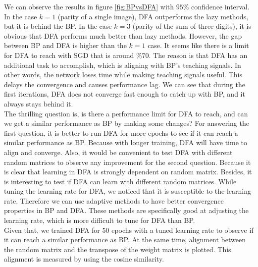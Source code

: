 \documentclass[a4paper, nobind]{templates/ociamthesis}
\begin{document}
\noindent We can observe the results in figure \ref{fig:BPvsDFA} with \(95\%\) confidence interval. In the case \(k=1\) (parity of a single image), DFA outperforms the lazy methods, but it is behind the BP. In the case \(k=3\) (parity of the sum of three digits), it is obvious that DFA performs much better than lazy methods. However, the gap between BP and DFA is higher than the \(k=1\) case. It seems like there is a limit for DFA to reach with SGD that is around \(\%70\). The reason is that DFA has an additional task to accomplish, which is aligning with BP's teaching signals. In other words, the network loses time while making teaching signals useful. This delays the convergence and causes performance lag. We can see that during the first iterations, DFA does not converge fast enough to catch up with BP, and it always stays behind it.\\
The thrilling question is, is there a performance limit for DFA to reach, and can we get a similar performance as BP by making some changes? For answering the first question, it is better to run DFA for more epochs to see if it can reach a similar performance as BP. Because with longer training, DFA will have time to align and converge. Also, it would be convenient to test DFA with different random matrices to observe any improvement for the second question. Because it is clear that learning in DFA is strongly dependent on random matrix. Besides, it is interesting to test if DFA can learn with different random matrices. While tuning the learning rate for DFA, we noticed that it is susceptible to the learning rate. Therefore we can use adaptive methods to have better convergence properties in BP and DFA. These methods are specifically good at adjusting the learning rate, which is more difficult to tune for DFA than BP.\\
\noindent Given that, we trained DFA for 50 epochs with a tuned learning rate to observe if it can reach a similar performance as BP. At the same time, alignment between the random matrix and the transpose of the weight matrix is plotted. This alignment is measured by using the cosine similarity.
\end{document}
